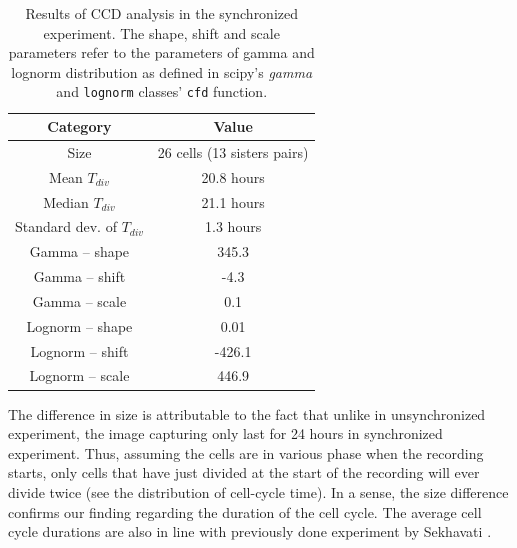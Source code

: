 \documentclass[pdftex,12pt,a4paper]{report}
\begin{document}
\begin{table}[H]
\centering
\begin{tabular}{ c | c }
Category & Value \\
\hline\hline
Size & 26 cells (13 sisters pairs) \\
Mean $T_{div}$ & 20.8 hours \\
Median $T_{div}$ & 21.1 hours \\
Standard dev. of $T_{div}$ & 1.3 hours \\
\hline
Gamma -- shape & 345.3 \\
Gamma -- shift & -4.3 \\
Gamma -- scale & 0.1 \\
\hline Lognorm -- shape & 0.01 \\
Lognorm --  shift & -426.1 \\
Lognorm --  scale & 446.9 \\
\hline
\end{tabular}
\caption[Results of CCD analysis in the synchronized experiment]{Results of CCD analysis in the synchronized experiment. The shape, shift and scale parameters refer to the parameters of gamma and lognorm  distribution as defined in scipy's \textit{gamma} and \texttt{lognorm} classes' \texttt{cfd} function.}
\label{table:ccd_res_syn}
\end{table}

The difference in size is attributable to the fact that unlike in unsynchronized experiment, the image capturing only last for 24 hours in synchronized experiment. Thus, assuming the cells are in various phase when the recording starts, only cells that have just divided at the start of the recording will ever divide twice (see the distribution of cell-cycle time). In a sense, the size difference confirms our finding regarding the duration of the cell cycle. The average cell cycle durations are also in line with previously done experiment by Sekhavati \cite{sekhavati2015dynamic}.
\end{document}
